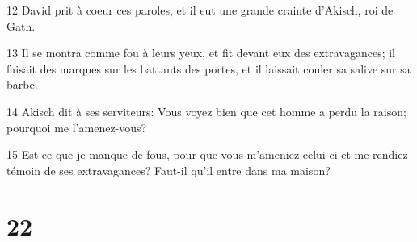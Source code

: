 \par 12 David prit à coeur ces paroles, et il eut une grande crainte d'Akisch, roi de Gath.
\par 13 Il se montra comme fou à leurs yeux, et fit devant eux des extravagances; il faisait des marques sur les battants des portes, et il laissait couler sa salive sur sa barbe.
\par 14 Akisch dit à ses serviteurs: Vous voyez bien que cet homme a perdu la raison; pourquoi me l'amenez-vous?
\par 15 Est-ce que je manque de fous, pour que vous m'ameniez celui-ci et me rendiez témoin de ses extravagances? Faut-il qu'il entre dans ma maison?

\chapter{22}

